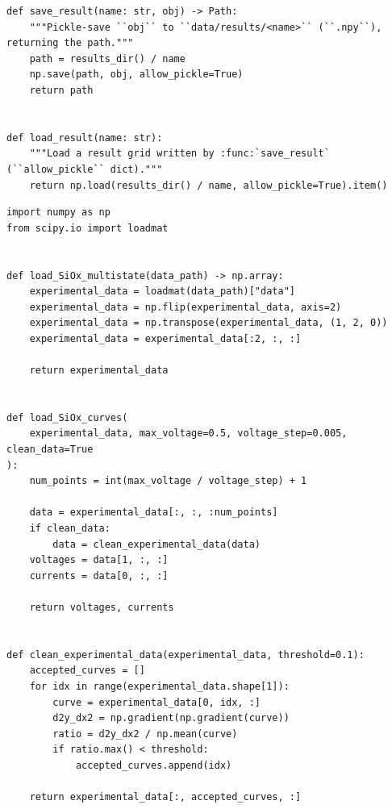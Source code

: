 \begin{lstlisting}[caption={mnn\_torch/paths.py},label={lst:mnn-src-paths}]
def save_result(name: str, obj) -> Path:
    """Pickle-save ``obj`` to ``data/results/<name>`` (``.npy``), returning the path."""
    path = results_dir() / name
    np.save(path, obj, allow_pickle=True)
    return path


def load_result(name: str):
    """Load a result grid written by :func:`save_result` (``allow_pickle`` dict)."""
    return np.load(results_dir() / name, allow_pickle=True).item()
\end{lstlisting}

\begin{lstlisting}[caption={mnn\_torch/devices.py},label={lst:mnn-src-devices}]
import numpy as np
from scipy.io import loadmat


def load_SiOx_multistate(data_path) -> np.array:
    experimental_data = loadmat(data_path)["data"]
    experimental_data = np.flip(experimental_data, axis=2)
    experimental_data = np.transpose(experimental_data, (1, 2, 0))
    experimental_data = experimental_data[:2, :, :]

    return experimental_data


def load_SiOx_curves(
    experimental_data, max_voltage=0.5, voltage_step=0.005, clean_data=True
):
    num_points = int(max_voltage / voltage_step) + 1

    data = experimental_data[:, :, :num_points]
    if clean_data:
        data = clean_experimental_data(data)
    voltages = data[1, :, :]
    currents = data[0, :, :]

    return voltages, currents


def clean_experimental_data(experimental_data, threshold=0.1):
    accepted_curves = []
    for idx in range(experimental_data.shape[1]):
        curve = experimental_data[0, idx, :]
        d2y_dx2 = np.gradient(np.gradient(curve))
        ratio = d2y_dx2 / np.mean(curve)
        if ratio.max() < threshold:
            accepted_curves.append(idx)

    return experimental_data[:, accepted_curves, :]
\end{lstlisting}

